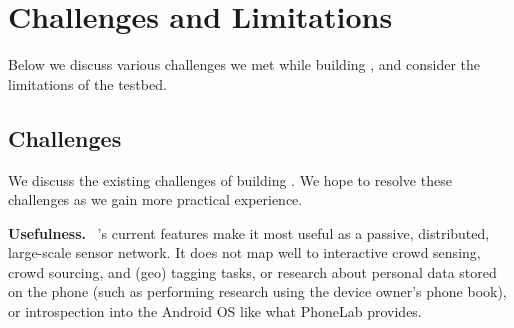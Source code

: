 \section{Challenges and Limitations}\label{sec-limitation}

Below we discuss
various challenges we met while building \sysname, 
and consider the limitations of the testbed.

\subsection{Challenges}\label{subsec-challenges}

We discuss the existing challenges of building \sysname. We hope to 
resolve these challenges as we gain more practical experience. 




\textbf{Usefulness.}~
\sysname's current features make it most 
useful as a passive, distributed, large-scale sensor network. 
It does not map well to interactive crowd sensing, crowd sourcing, 
and (geo) tagging tasks, or research about personal data stored 
on the phone (such as performing research using the device owner's 
phone book),
or introspection into the Android OS like what PhoneLab provides. 

